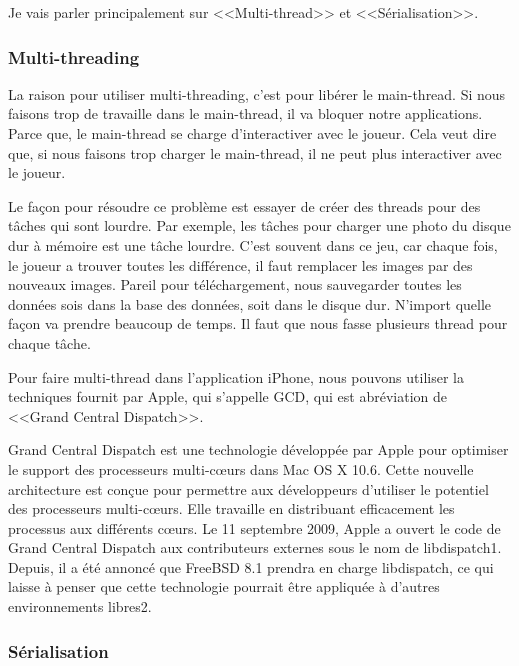 Je vais parler principalement sur <<Multi-thread>> et <<Sérialisation>>.

\subsubsection{Multi-threading} %
\label{ssub:multi_thread}

La raison pour utiliser multi-threading, c'est pour libérer le main-thread. Si nous faisons trop de travaille dans le main-thread, il va bloquer notre applications. Parce que, le main-thread se charge d'interactiver avec le joueur. Cela veut dire que, si nous faisons trop charger le main-thread, il ne peut plus interactiver avec le joueur. 

Le façon pour résoudre ce problème est essayer de créer des threads pour des tâches qui sont lourdre. Par exemple, les tâches pour charger une photo du disque dur à mémoire est une tâche lourdre. C'est souvent dans ce jeu, car chaque fois, le joueur a trouver toutes les différence, il faut remplacer les images par des nouveaux images. Pareil pour téléchargement, nous sauvegarder toutes les données sois dans la base des données, soit dans le disque dur. N'import quelle façon va prendre beaucoup de temps. Il faut que nous fasse plusieurs thread pour chaque tâche.

Pour faire multi-thread dans l'application iPhone, nous pouvons utiliser la techniques fournit par Apple, qui s'appelle GCD, qui est abréviation de <<Grand Central Dispatch>>.


Grand Central Dispatch est une technologie développée par Apple pour optimiser le support des processeurs multi-cœurs dans Mac OS X 10.6.
Cette nouvelle architecture est conçue pour permettre aux développeurs d'utiliser le potentiel des processeurs multi-cœurs. Elle travaille en distribuant efficacement les processus aux différents cœurs.
Le 11 septembre 2009, Apple a ouvert le code de Grand Central Dispatch aux contributeurs externes sous le nom de libdispatch1. Depuis, il a été annoncé que FreeBSD 8.1 prendra en charge libdispatch, ce qui laisse à penser que cette technologie pourrait être appliquée à d'autres environnements libres2.



\subsubsection{Sérialisation} %
\label{ssub:sérialisation}

